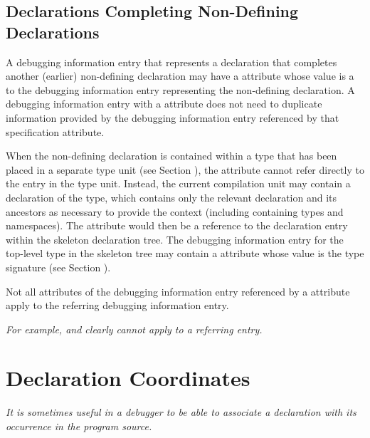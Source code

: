 \subsection{Declarations Completing Non-Defining Declarations}
A debugging information entry that represents a 
declaration\hypertarget{chap:DWATspecificationincompletenondefiningorseparatedeclaration}{}
that completes another (earlier) non-defining declaration may have a 
\DWATspecification{}
attribute whose value is a  to
the debugging information entry representing the non-defining declaration. 
A debugging information entry with a 
\DWATspecification{} 
attribute does not need to duplicate information provided by the 
debugging information entry referenced by that specification attribute.

When the non-defining declaration is contained within a type that has
been placed in a separate type unit (see Section ), 
the \DWATspecification{} attribute cannot refer directly to the entry in
the type unit. Instead, the current compilation unit may contain a
 declaration of the type, which contains only the relevant
declaration and its ancestors as necessary to provide the context
(including containing types and namespaces). The \DWATspecification{}
attribute would then be a reference to the declaration entry within
the skeleton declaration tree. The debugging information entry for the
top-level type in the skeleton tree may contain a \DWATsignature{}
attribute whose value is the type signature 
(see Section ).


Not all attributes of the debugging information entry referenced by a
\DWATspecification{} attribute 
apply to the referring debugging information entry.

\textit{For 
example,
\DWATsibling{} and 
\DWATdeclaration{} 
clearly cannot apply to a 
referring
entry.}



\section{Declaration Coordinates}
\label{chap:declarationcoordinates}
\textit{It is sometimes useful in a debugger to be able to associate
a declaration with its occurrence in the program source.}


